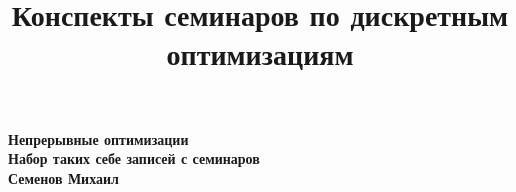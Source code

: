 \documentclass[11pt,a4paper]{article}
\title{Конспекты семинаров по дискретным оптимизациям}
\begin{document}
    
    \begin{center}
    {\bf \Large
        Непрерывные оптимизации\\
        Набор таких себе записей с семинаров\\
        Семенов Михаил
    }
    \end{center}
    
    
    
    
    
    
    
    
            
\end{document}
